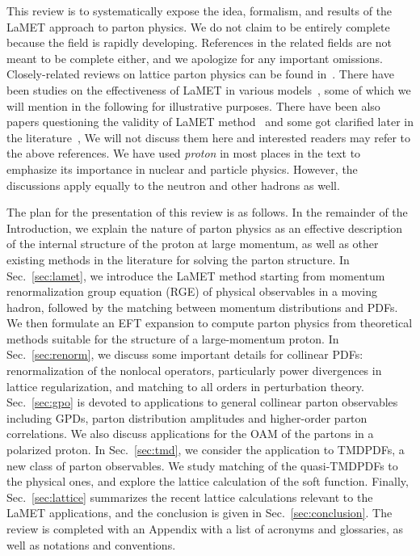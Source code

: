 \documentclass[aps,rmp,reprint,amsmath,amssymb,graphicx,longbibliography]{revtex4-1} %
\DeclareRobustCommand{\sec}[1]{Sec.~\ref{sec:#1}}
\begin{document}
This review is to systematically expose the idea, formalism, and results
of the LaMET approach to parton physics. We do not claim to be entirely complete
because the field is rapidly developing. References in the related fields
are not meant to be complete either, and we apologize for any important omissions.
Closely-related reviews on lattice parton physics can be found in~\cite{Cichy:2018mum,Zhao:2018fyu}.
There have been studies on the effectiveness of LaMET in various
models~\cite{Ji:2018waw,Gamberg:2014zwa,Broniowski:2017wbr,Xu:2018eii,
	Son:2019ghf,Ma:2019agv,Nam:2017gzm,Bhattacharya:2018zxi,Jia:2015pxx,Hobbs:2017xtq,Broniowski:2017gfp,
	Radyushkin:2017gjd,Bhattacharya:2019cme,Kock:2020frx,DelDebbio:2020cbz},
some of which we will mention in the following for illustrative purposes.
There have been also papers questioning the validity of LaMET method~\cite{Carlson:2017gpk,Rossi:2017muf,Rossi:2018zkn} and some got clarified later in the literature~\cite{Briceno:2017cpo,Ji:2017rah,Radyushkin:2018nbf},
We will not discuss them here and interested readers may refer to the above references.
We have used {\it proton} in most places in the text
to emphasize its importance in nuclear and particle physics. However,
the discussions apply equally to the neutron and other hadrons as well.

The plan for the presentation of this review is as follows. In the remainder of the Introduction, we
explain the nature of parton physics as an effective description
of the internal structure of the proton at large momentum, as well as other existing methods
in the literature for solving the parton structure.
In \sec{lamet}, we introduce the LaMET method starting from
momentum renormalization group equation (RGE) of physical observables in a moving hadron,
followed by the matching between momentum distributions and PDFs. We then formulate an EFT
expansion to compute parton physics from theoretical methods suitable for the structure of a
large-momentum proton. In \sec{renorm}, we discuss some important details for
collinear PDFs: renormalization of the nonlocal operators, particularly
power divergences in lattice regularization, and matching to all orders
in perturbation theory. \sec{gpo} is devoted to applications to general collinear parton observables
including GPDs, parton distribution amplitudes
and higher-order parton correlations. We also discuss applications
for the OAM of the partons in a polarized proton.
In \sec{tmd}, we consider the application to
TMDPDFs, a new class of parton observables. We study matching of the quasi-TMDPDFs to the physical ones,
and explore the lattice calculation of the soft function.
Finally, \sec{lattice} summarizes the recent lattice calculations relevant to
the LaMET applications, and the conclusion is given in \sec{conclusion}.
The review is completed with an Appendix
with a list of acronyms and glossaries, as well as notations and conventions.
\end{document}
